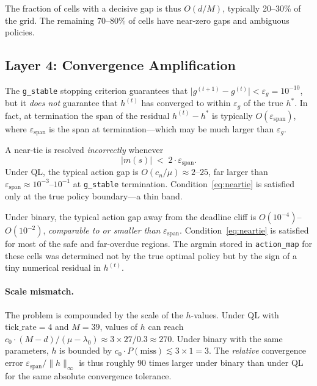 \documentclass[11pt,a4paper]{article}
\begin{document}
The fraction of cells with a decisive gap is thus $O(d / M)$, typically 20--30\%
of the grid.  The remaining 70--80\% of cells have near-zero gaps and ambiguous
policies.

\subsection{Layer 4: Convergence Amplification}

The \texttt{g\_stable} stopping criterion guarantees that
$\lvert g^{(t+1)} - g^{(t)} \rvert < \varepsilon_g = 10^{-10}$, but it
\emph{does not} guarantee that $h^{(t)}$ has converged to within $\varepsilon_g$
of the true $h^*$.  In fact, at termination the span of the residual
$h^{(t)} - h^*$ is typically $O(\varepsilon_\text{span})$, where
$\varepsilon_\text{span}$ is the span at termination---which may be much larger
than $\varepsilon_g$.

A near-tie is resolved \emph{incorrectly} whenever
\begin{equation}
  \lvert m(s) \rvert \;<\; 2 \cdot \varepsilon_\text{span}.
  \label{eq:neartie}
\end{equation}
Under QL, the typical action gap is $O(c_n / \mu) \approx 2$--$25$, far larger
than $\varepsilon_\text{span} \approx 10^{-3}$--$10^{-1}$ at \texttt{g\_stable}
termination.  Condition~\eqref{eq:neartie} is satisfied only at the true policy
boundary---a thin band.

Under binary, the typical action gap away from the deadline cliff is
$O(10^{-4})$--$O(10^{-2})$, \emph{comparable to or smaller than}
$\varepsilon_\text{span}$.  Condition~\eqref{eq:neartie} is satisfied for most
of the safe and far-overdue regions.  The argmin stored in \texttt{action\_map}
for these cells was determined not by the true optimal policy but by the sign of
a tiny numerical residual in $h^{(t)}$.

\paragraph{Scale mismatch.}
The problem is compounded by the scale of the $h$-values.  Under QL with
$\text{tick\_rate} = 4$ and $M = 39$, values of $h$ can reach
$c_0 \cdot (M - d) / (\mu - \lambda_0) \approx 3 \times 27 / 0.3 \approx 270$.
Under binary with the same parameters, $h$ is bounded by
$c_0 \cdot P(\text{miss}) \lesssim 3 \times 1 = 3$.
The \emph{relative} convergence error $\varepsilon_\text{span} / \|h\|_\infty$
is thus roughly 90 times larger under binary than under QL for the same
absolute convergence tolerance.
\end{document}

